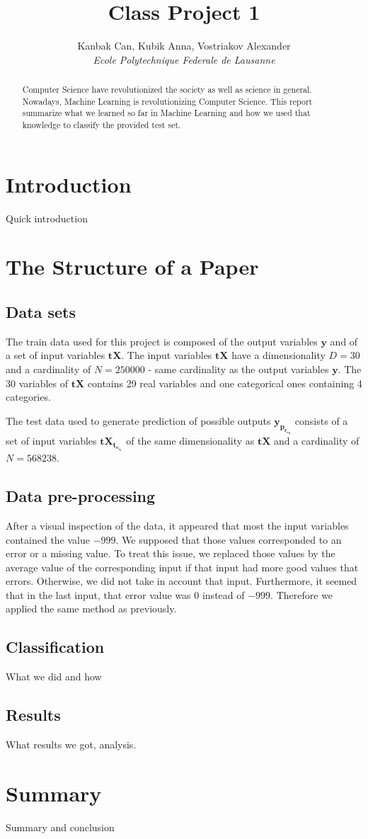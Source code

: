 \documentclass[10pt,conference,compsocconf]{IEEEtran}
\begin{document}
\title{Class Project 1}

\author{
  Kanbak Can, Kubik Anna, Vostriakov Alexander\\
  \textit{Ecole Polytechnique Federale de Lausanne}
}

\maketitle

\begin{abstract}
 Computer Science have revolutionized the society as well as science in general. Nowadays, Machine Learning is revolutionizing Computer Science.
 This report summarize what we learned so far in Machine Learning and how we used that knowledge to classify the provided test set.
\end{abstract}

\section{Introduction}

Quick introduction

\section{The Structure of a Paper}
\label{sec:structure-paper}
\subsection{Data sets}
The train data used for this project is composed of the output variables $\mathbf{y}$ and of a set of input variables $\mathbf{tX}$. The input variables $\mathbf{tX}$ have a dimensionality $D=30$ and a cardinality of $N=250000$ - same cardinality as the output variables $\mathbf{y}$. The 30 variables of $\mathbf{tX}$ contains 29 real variables and one categorical ones containing 4 categories.

The test data used to generate prediction of possible outputs $\mathbf{y_p_r_e_d}$ consists of a set of input variables $\mathbf{tX_t_e_s_t}$ of the same dimensionality as $\mathbf{tX}$ and a cardinality of $N=568238$.
\subsection{Data pre-processing}
After a visual inspection of the data, it appeared that most the input variables contained the value $-999$. We supposed that those values corresponded to an error or a missing value. To treat this issue, we replaced those values by the average value of the corresponding input if that input had more good values that errors. Otherwise, we did not take in account that input.
Furthermore, it seemed that in the last input, that error value was $0$ instead of $-999$. Therefore we applied the same method as previously.
\subsection{Classification}
What we did and how
\subsection{Results}
What results we got, analysis.

\section{Summary}

Summary and conclusion
\end{document}
